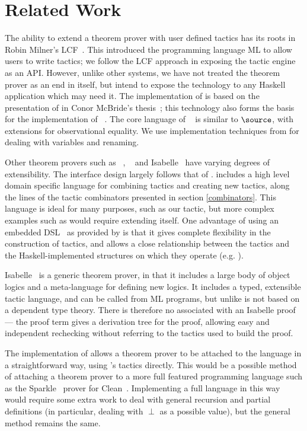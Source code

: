 \section{Related Work}

The ability to extend a theorem prover with user defined tactics has
its roots in Robin Milner's LCF~\cite{lcf-milner}. This introduced the
programming language ML to allow users to write tactics; we follow the
LCF approach in exposing the tactic engine as an API. However, unlike
other systems, we have not treated the theorem prover as an end in
itself, but intend to expose the technology to any Haskell application
which may need it.  The implementation of \Ivor{} is based on the
presentation of \Oleg{} in Conor McBride's
thesis~\cite{mcbride-thesis}; this technology also forms the basis for
the implementation of \Epigram{}~\cite{view-left}. The core language
of \Epigram{}~\cite{epireloaded} is similar to $\source$, with
extensions for observational equality. We use implementation
techniques from \cite{not-a-number} for dealing with variables and
renaming.

Other theorem provers such as \Coq{}~\cite{coq-manual},
\Agda{}~\cite{agda} and Isabelle~\cite{isabelle} have varying degrees
of extensibility. The interface design largely follows that of
\Coq{}. \Coq{} includes a high level domain specific language for
combining tactics and creating new tactics, along the lines of the
tactic combinators presented in section \ref{combinators}. This
language is ideal for many purposes, such as our 
tactic, but more complex examples such as  would
require extending \Coq{} itself. One advantage of using an embedded
DSL~\cite{hudak-edsl} as provided by \Ivor{} is that it gives complete
flexibility in the construction of tactics, and allows a close
relationship between the tactics and the Haskell-implemented
structures on which they operate (e.g. ).

Isabelle~\cite{isabelle} is a
generic theorem prover, in that it includes a large body of object
logics and a meta-language for defining new logics. It includes a
typed, extensible tactic language, and can be called from ML programs,
but unlike \Ivor{} is not based on a dependent type theory.
There is therefore no  associated with an Isabelle
proof --- the proof term gives a derivation tree for the
proof, allowing easy and independent rechecking without referring to
the tactics used to build the proof. 

The implementation of \Funl{} allows a theorem prover to be attached
to the language in a straightforward way, using \Ivor{}'s tactics
directly. This would be a possible method of attaching a theorem
prover to a more full featured programming language such as the
Sparkle~\cite{sparkle} prover for Clean~\cite{clean}. Implementing a
full language in this way would require some extra work to deal
with general recursion and partial definitions (in particular, dealing
with $\perp$ as a possible value), but the general method remains the same.

